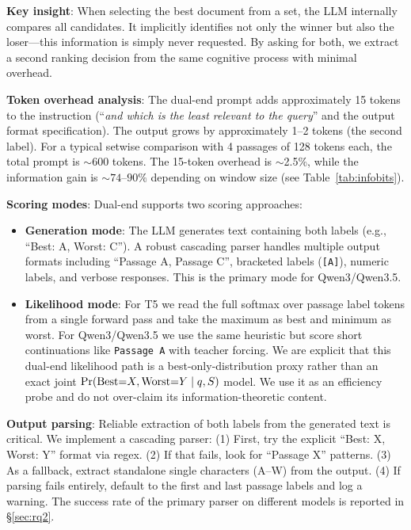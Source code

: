 \textbf{Key insight}: When selecting the best document from a set, the LLM internally compares all candidates. It implicitly identifies not only the winner but also the loser---this information is simply never requested. By asking for both, we extract a second ranking decision from the same cognitive process with minimal overhead.

\textbf{Token overhead analysis}: The dual-end prompt adds approximately 15 tokens to the instruction (``\emph{and which is the least relevant to the query}'' and the output format specification). The output grows by approximately 1--2 tokens (the second label). For a typical setwise comparison with 4 passages of 128 tokens each, the total prompt is $\sim$600 tokens. The 15-token overhead is $\sim$2.5\%, while the information gain is $\sim$$74$--$90\%$ depending on window size (see Table~\ref{tab:infobits}).

\textbf{Scoring modes}: Dual-end supports two scoring approaches:
\begin{itemize}[leftmargin=*]
\item \textbf{Generation mode}: The LLM generates text containing both labels (e.g., ``Best: A, Worst: C''). A robust cascading parser handles multiple output formats including ``Passage A, Passage C'', bracketed labels (\texttt{[A]}), numeric labels, and verbose responses. This is the primary mode for Qwen3/Qwen3.5.
\item \textbf{Likelihood mode}: For T5 we read the full softmax over passage label tokens from a single forward pass and take the maximum as best and minimum as worst. For Qwen3/Qwen3.5 we use the same heuristic but score short continuations like \texttt{Passage A} with teacher forcing. We are explicit that this dual-end likelihood path is a best-only-distribution proxy rather than an exact joint $\Pr(\textnormal{Best}{=}X,\textnormal{Worst}{=}Y\mid q,S)$ model. We use it as an efficiency probe and do not over-claim its information-theoretic content.
\end{itemize}

\textbf{Output parsing}: Reliable extraction of both labels from the generated text is critical. We implement a cascading parser:
(1) First, try the explicit ``Best: X, Worst: Y'' format via regex.
(2) If that fails, look for ``Passage X'' patterns.
(3) As a fallback, extract standalone single characters (A--W) from the output.
(4) If parsing fails entirely, default to the first and last passage labels and log a warning.
The success rate of the primary parser on different models is reported in \S\ref{sec:rq2}.


